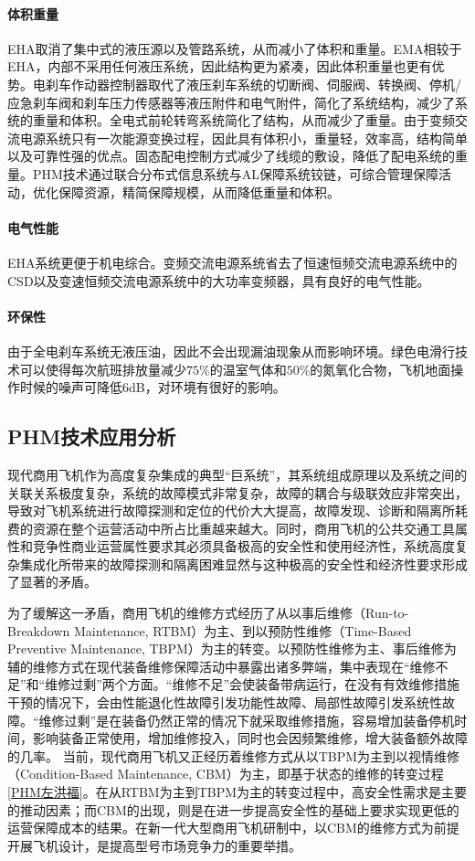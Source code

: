\documentclass[12pt,a4paper]{report}
\begin{document}
\paragraph{体积重量}
EHA取消了集中式的液压源以及管路系统，从而减小了体积和重量。EMA相较于EHA，内部不采用任何液压系统，因此结构更为紧凑，因此体积重量也更有优势。电刹车作动器控制器取代了液压刹车系统的切断阀、伺服阀、转换阀、停机/应急刹车阀和刹车压力传感器等液压附件和电气附件，简化了系统结构，减少了系统的重量和体积。全电式前轮转弯系统简化了结构，从而减少了重量。由于变频交流电源系统只有一次能源变换过程，因此具有体积小，重量轻，效率高，结构简单以及可靠性强的优点。固态配电控制方式减少了线缆的敷设，降低了配电系统的重量。PHM技术通过联合分布式信息系统与AL保障系统铰链，可综合管理保障活动，优化保障资源，精简保障规模，从而降低重量和体积。

\paragraph{电气性能}
EHA系统更便于机电综合。变频交流电源系统省去了恒速恒频交流电源系统中的CSD以及变速恒频交流电源系统中的大功率变频器，具有良好的电气性能。

\paragraph{环保性}
由于全电刹车系统无液压油，因此不会出现漏油现象从而影响环境。绿色电滑行技术可以使得每次航班排放量减少$75\%$的温室气体和$50\%$的氮氧化合物，飞机地面操作时候的噪声可降低6dB，对环境有很好的影响。

\subsection{PHM技术应用分析}

现代商用飞机作为高度复杂集成的典型“巨系统”，其系统组成原理以及系统之间的关联关系极度复杂，系统的故障模式非常复杂，故障的耦合与级联效应非常突出，导致对飞机系统进行故障探测和定位的代价大大提高，故障发现、诊断和隔离所耗费的资源在整个运营活动中所占比重越来越大。同时，商用飞机的公共交通工具属性和竞争性商业运营属性要求其必须具备极高的安全性和使用经济性，系统高度复杂集成化所带来的故障探测和隔离困难显然与这种极高的安全性和经济性要求形成了显著的矛盾。

为了缓解这一矛盾，商用飞机的维修方式经历了从以事后维修（Run-to-Breakdown Maintenance, RTBM）为主、到以预防性维修（Time-Based Preventive Maintenance, TBPM）为主的转变。以预防性维修为主、事后维修为辅的维修方式在现代装备维修保障活动中暴露出诸多弊端，集中表现在“维修不足”和“维修过剩”两个方面。“维修不足”会使装备带病运行，在没有有效维修措施干预的情况下，会由性能退化性故障引发功能性故障、局部性故障引发系统性故障。“维修过剩”是在装备仍然正常的情况下就采取维修措施，容易增加装备停机时间，影响装备正常使用，增加维修投入，同时也会因频繁维修，增大装备额外故障的几率。
当前，现代商用飞机又正经历着维修方式从以TBPM为主到以视情维修（Condition-Based Maintenance, CBM）为主，即基于状态的维修的转变过程\ref{PHM左洪福}。在从RTBM为主到TBPM为主的转变过程中，高安全性需求是主要的推动因素；而CBM的出现，则是在进一步提高安全性的基础上要求实现更低的运营保障成本的结果。在新一代大型商用飞机研制中，以CBM的维修方式为前提开展飞机设计，是提高型号市场竞争力的重要举措。
\end{document}
